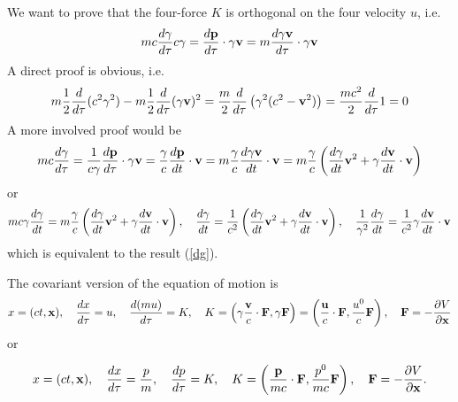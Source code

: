 We want to prove that the four-force $K$ is orthogonal on the four velocity $u$, i.e.
\begin{align}
  mc \frac{d\gamma}{d\tau} c\gamma = \frac{d{\bf p}}{d\tau}\cdot\gamma{\bf v}=m\frac{d\gamma{\bf v}}{d\tau}\cdot\gamma{\bf v}
\end{align}
A direct proof is obvious, i.e.
\begin{align}
  m\frac12\frac{d}{d\tau}(c^2\gamma^2)-m\frac12\frac{d}{d\tau}(\gamma{\bf v})^2=\frac{m}2\frac{d}{d\tau}\left(\gamma^2(c^2-{\bf v}^2)\right)=\frac{mc^2}{2}\frac{d}{d\tau}1=0
\end{align}
A more involved proof would be
\begin{align}
  mc\frac{d\gamma}{d\tau} =\frac1{c\gamma}\frac{d{\bf p}}{d\tau}\cdot\gamma{\bf v} = \frac{\gamma}c\frac{d{\bf p}}{dt}\cdot{\bf v}=m\frac{\gamma}c\frac{d\gamma{\bf v}}{dt}\cdot{\bf v}=m\frac{\gamma}c\left(\frac{d\gamma}{dt}{\bf v}^2+\gamma\frac{d{\bf v}}{dt}\cdot{\bf v}\right)
\end{align}
or
\begin{align}
  mc\gamma\frac{d\gamma}{dt}=m\frac{\gamma}c\left(\frac{d\gamma}{dt}{\bf v}^2+\gamma\frac{d{\bf v}}{dt}\cdot{\bf v}\right),\quad \frac{d\gamma}{dt} =\frac1{c^2}\left(\frac{d\gamma}{dt}{\bf v}^2+\gamma\frac{d{\bf v}}{dt}\cdot{\bf v}\right),\quad \frac{1}{\gamma^2}\frac{d\gamma}{dt}=\frac1{c^2}\gamma\frac{d{\bf v}}{dt}\cdot{\bf v}
\end{align}
which is equivalent to the result (\ref{dg}).

The covariant version of the equation of motion is
\begin{align}
  x = (ct, {\bf x}),\quad \frac{dx}{d\tau} = u,\quad \frac{d (mu)}{d\tau} = K,\quad K = \left(\gamma\frac{{\bf v}}c\cdot{\bf F},\gamma{\bf F}\right) = \left(\frac{{\bf u}}c\cdot{\bf F},\frac{u^0}{c}{\bf F}\right),\quad {\bf F} = -\frac{\partial V}{\partial {\bf x}}
\end{align}
or
\begin{importantbox}
  \begin{align}
    x = (ct, {\bf x}),\quad \frac{dx}{d\tau} = \frac{p}{m},\quad \frac{d p}{d\tau} = K,\quad
    K  = \left(\frac{{\bf p}}{mc}\cdot{\bf F},\frac{p^0}{mc}{\bf F}\right),\quad
    {\bf F} = -\frac{\partial V}{\partial {\bf x}}.
  \end{align}
\end{importantbox}

